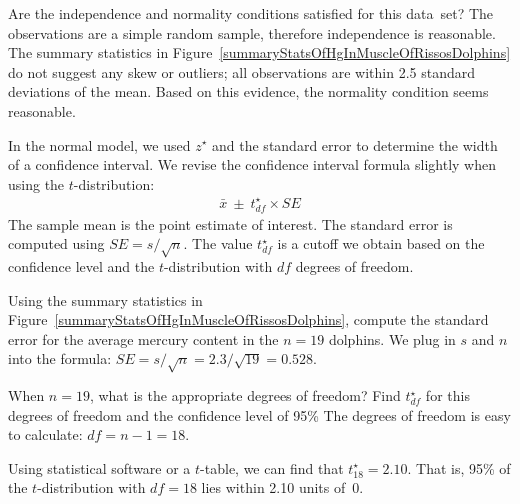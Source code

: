 \begin{examplewrap}
\begin{nexample}{Are the independence and
    normality conditions satisfied for this data~set?}
  The observations are a simple random sample,
  therefore independence is reasonable.
  The summary statistics in
  Figure~\ref{summaryStatsOfHgInMuscleOfRissosDolphins}
  do not suggest any skew or outliers;
  all observations are within 2.5 standard deviations
  of the mean.
  Based on this evidence, the normality condition
  seems reasonable.
\end{nexample}
\end{examplewrap}

In the normal model, we used $z^{\star}$ and the standard error to determine the width of a confidence interval. We revise the confidence interval formula slightly when using the $t$-distribution:
\begin{align*}
\bar{x} \ \pm\  t^{\star}_{df} \times SE
\end{align*}
The sample mean is the point estimate of interest.
The standard error is computed using $SE = s/\sqrt{n}$.
The value $t^{\star}_{df}$ is a cutoff we obtain based on the
confidence level and the $t$-distribution with $df$ degrees
of freedom.

\begin{examplewrap}
\begin{nexample}{Using the summary statistics in
    Figure~\ref{summaryStatsOfHgInMuscleOfRissosDolphins},
    compute the standard error for the average
    mercury content in the $n = 19$ dolphins.}
  We plug in $s$ and $n$ into the formula:
  $
  SE
    = s / \sqrt{n}
    = 2.3 / \sqrt{19}
    = 0.528
  $.
\end{nexample}
\end{examplewrap}

\begin{examplewrap}
\begin{nexample}{When $n = 19$, what is the appropriate
    degrees of freedom?
    Find $t^{\star}_{df}$ for this degrees of freedom
    and the confidence level of 95\%}
  The degrees of freedom is easy to calculate:
  $df = n - 1 = 18$.
  
  Using statistical software or a $t$-table,
  we can find that $t^{\star}_{18} = 2.10$.
  That is, 95\% of the $t$-distribution with $df = 18$
  lies within 2.10 units of~0.
\end{nexample}
\end{examplewrap}

